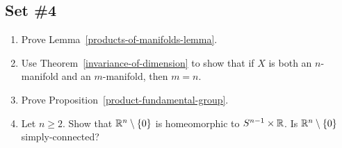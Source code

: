 \subsection{Set \#4}
\begin{enumerate}[label=4.\arabic*]
  \item \label{products-of-manifolds-exercise} Prove Lemma~\ref{products-of-manifolds-lemma}.
  \item \label{invariance-of-dimension-manifolds} Use Theorem~\ref{invariance-of-dimension} to show that if $X$ is both an $n$-manifold and an $m$-manifold, then $m = n$.
  \item \label{product-fundamental-group-exercise} Prove Proposition~\ref{product-fundamental-group}.
  \item Let $n \geq 2$. Show that $\mathbb{R}^n \setminus \{0\}$ is homeomorphic to $S^{n-1} \times \mathbb{R}$. Is $\mathbb{R}^n \setminus \{0\}$ simply-connected?
\end{enumerate}
